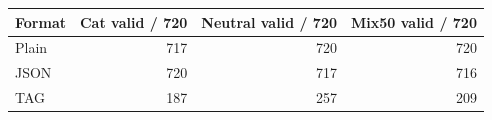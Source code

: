 \begin{tabular}{lrrr}
\toprule
Format & Cat valid / 720 & Neutral valid / 720 & Mix50 valid / 720 \\
\midrule
Plain & 717 & 720 & 720 \\
JSON & 720 & 717 & 716 \\
TAG & 187 & 257 & 209 \\
\bottomrule
\end{tabular}
